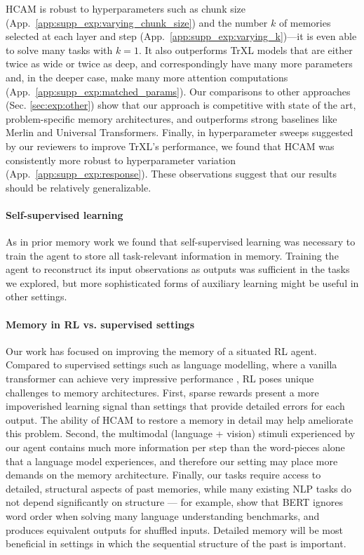 \documentclass{article}
\begin{document}
HCAM is robust to hyperparameters such as chunk size (App.\ \ref{app:supp_exp:varying_chunk_size}) and the number \(k\) of memories selected at each layer and step (App.\ \ref{app:supp_exp:varying_k})---it is even able to solve many tasks with \(k=1\). It also outperforms TrXL models that are either twice as wide or twice as deep, and correspondingly have many more parameters and, in the deeper case, make many more attention computations (App.\ \ref{app:supp_exp:matched_params}). Our comparisons to other approaches (Sec. \ref{sec:exp:other}) show that our approach is competitive with state of the art, problem-specific memory architectures, and outperforms strong baselines like Merlin and Universal Transformers. Finally, in hyperparameter sweeps suggested by our reviewers to improve TrXL's performance, we found that HCAM was consistently more robust to hyperparameter variation (App.\ \ref{app:supp_exp:response}). These observations suggest that our results should be relatively generalizable.\vspace{-0.5em}

\paragraph{Self-supervised learning} As in prior memory work \citep{wayne2018unsupervised,fortunato2019generalization,hill2020grounded} we found that self-supervised learning was necessary to train the agent to store all task-relevant information in memory. Training the agent to reconstruct its input observations as outputs was sufficient in the tasks we explored, but more sophisticated forms of auxiliary learning \citep{jaderberg2016reinforcement,banino2021coberl} might be useful in other settings. \vspace{-0.5em}

\paragraph{Memory in RL vs. supervised settings} Our work has focused on improving the memory of a situated RL agent. Compared to supervised settings such as language modelling, where a vanilla transformer can achieve very impressive performance \citep{raffel2020exploring,brown2020language}, RL poses unique challenges to memory architectures. First, sparse rewards present a more impoverished learning signal than settings that provide detailed errors for each output. The ability of HCAM to restore a memory in detail may help ameliorate this problem. Second, the multimodal (language + vision) stimuli experienced by our agent contains much more information per step than the word-pieces alone that a language model experiences, and therefore our setting may place more demands on the memory architecture. Finally, our tasks require access to detailed, structural aspects of past memories, while many existing NLP tasks do not depend significantly on structure --- for example, \citet{pham2020out} show that BERT ignores word order when solving many language understanding benchmarks, and produces equivalent outputs for shuffled inputs. Detailed memory will be most beneficial in settings in which the sequential structure of the past is important.
\end{document}
